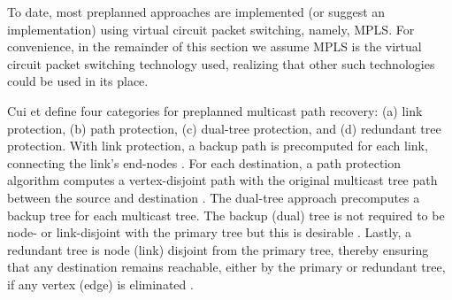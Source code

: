 To date, most preplanned approaches \cite{Cui04,Fei01,Medard99,Pointurier02,Wu97} are implemented (or suggest an implementation) using 
virtual circuit packet switching, namely, MPLS. 
For convenience, in the remainder of this section we assume MPLS is the virtual circuit packet switching technology used, realizing that other such technologies could be used in its place.

Cui et \cite{Cui04} define four categories for preplanned multicast path recovery: (a) link protection, (b) path protection, (c) dual-tree protection, and (d) redundant tree protection.
With link protection, a backup path is precomputed for each link, connecting the link's end-nodes \cite{Pointurier02,Wu97}. 
For each destination, a path protection algorithm computes a vertex-disjoint path with the original multicast tree path between the source and destination \cite{Wu97}. 
The dual-tree approach precomputes a backup tree for each multicast tree. The backup (dual) tree is not required to be node- or link-disjoint with the primary tree but this is 
desirable \cite{Fei01,Tam09}. Lastly, a redundant tree is node (link) disjoint from the primary tree, thereby ensuring that any destination
remains reachable, either by the primary or redundant tree, if any vertex (edge) is eliminated \cite{Medard99}.  



